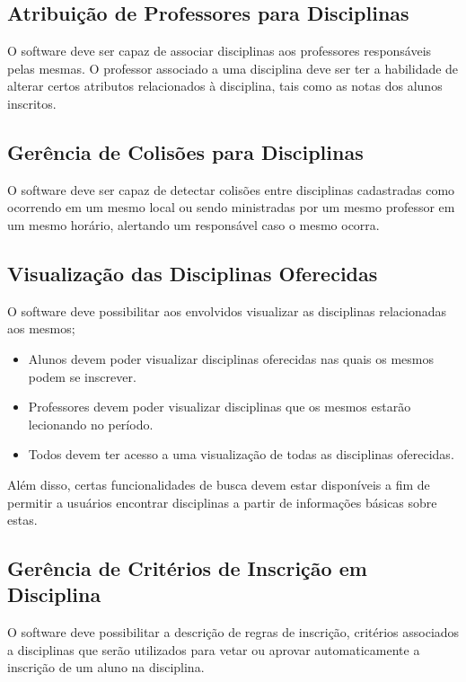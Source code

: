 \documentclass{article}
\begin{document}
\subsection{Atribuição de Professores para Disciplinas}
O software deve ser capaz de associar disciplinas aos professores responsáveis pelas mesmas. O professor associado a uma disciplina deve ser ter a habilidade de alterar certos atributos relacionados à disciplina, tais como as notas dos alunos inscritos.

\subsection{Gerência de Colisões para Disciplinas}
O software deve ser capaz de detectar colisões entre disciplinas cadastradas como ocorrendo em um mesmo local ou sendo ministradas por um mesmo professor em um mesmo horário, alertando um responsável caso o mesmo ocorra.

\subsection{Visualização das Disciplinas Oferecidas}
O software deve possibilitar aos envolvidos visualizar as disciplinas relacionadas aos mesmos;
\begin{itemize}
    \item Alunos devem poder visualizar disciplinas oferecidas nas quais os mesmos podem se inscrever.
    \item Professores devem poder visualizar disciplinas que os mesmos estarão lecionando no período.
    \item Todos devem ter acesso a uma visualização de todas as disciplinas oferecidas.
\end{itemize}
Além disso, certas funcionalidades de busca devem estar disponíveis a fim de permitir a usuários encontrar disciplinas a partir de informações básicas sobre estas.

\subsection{Gerência de Critérios de Inscrição em Disciplina}
O software deve possibilitar a descrição de regras de inscrição, critérios associados a disciplinas que serão utilizados para vetar ou aprovar automaticamente a inscrição de um aluno na disciplina. 
\end{document}
